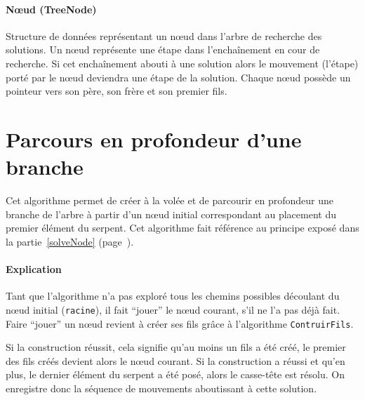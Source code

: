 \paragraph{Nœud (TreeNode)} Structure de données représentant un nœud dans l'arbre de recherche des solutions. Un nœud représente une étape dans l'enchaînement en cour de recherche. Si cet enchaînement abouti à une solution alors le mouvement (l'étape) porté par le nœud deviendra une étape de la solution.
Chaque nœud possède un pointeur vers son père, son frère et son premier fils.

\section{Parcours en profondeur d'une branche}
Cet algorithme permet de créer à la volée et de parcourir en profondeur une branche de l'arbre à partir d'un nœud initial correspondant au placement du premier élément du serpent. Cet algorithme fait référence au principe exposé dans la partie~\ref{solveNode} (page~\pageref{solveNode}).

\begin{algo}
 \VAR
 \ENDVAR
 \BEGIN
 \ENDIF
 \ELSE
 \ELSE
 \ENDIF
 \ENDIF
 \ENDWHILE
 \END
\end{algo}

\newpage
\paragraph{Explication}
Tant que l'algorithme n'a pas exploré tous les chemins possibles découlant du nœud initial (\verb|racine|), il fait ``jouer'' le nœud courant, s'il ne l'a pas déjà fait. Faire ``jouer'' un nœud revient à créer ses fils grâce à l'algorithme \verb|ContruirFils|.

Si la construction réussit, cela signifie qu'au moins un fils a été créé, le premier des fils créés devient alors le nœud courant. Si la construction a réussi et qu'en plus, le dernier élément du serpent a été posé, alors le casse-tête est résolu. On enregistre donc la séquence de mouvements aboutissant à cette solution. 

